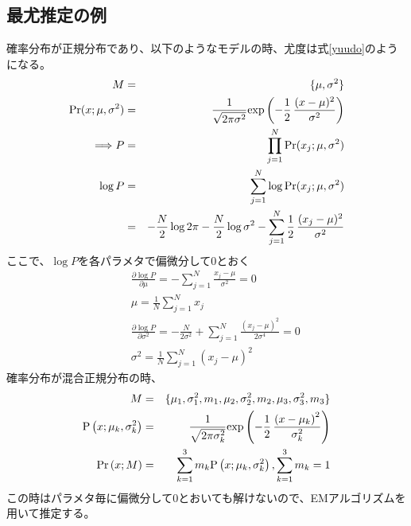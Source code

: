 \documentclass[dvipdfmx,titlepage, a4paper]{jsarticle}%
\begin{document}
\subsection{最尤推定の例}
確率分布が正規分布であり、以下のようなモデルの時、尤度は式\eqref{yuudo}のようになる。
\begin{eqnarray}
	M &=& \{\mu, \sigma^{2}\} \nonumber \\
	{\rm Pr}(x;\mu, \sigma^{2}) &=& \frac{1}{\sqrt{2 \pi \sigma^{2}}}{\rm exp}\left(-\frac{1}{2}\, \frac{(x - \mu)^{2}}{\sigma^{2}}\right) \nonumber\\
	\Longrightarrow
	P &=& \prod_{j = 1}^{N}{\rm Pr}(x_{j};\mu, \sigma^{2}) \nonumber\\
	\log P &=& \sum_{j = 1}^{N}\log {\rm Pr}(x_{j};\mu, \sigma^{2}) \nonumber\\
		  &=& -\frac{N}{2}\log 2\pi - \frac{N}{2}\log \sigma^{2} - \sum_{j = 1}^{N}\frac{1}{2}\, \frac{(x_{j} - \mu)^{2}}{\sigma^{2}}\label{yuudo}
\end{eqnarray}
ここで、$\log P$を各パラメタで偏微分して0とおく
\begin{eqnarray*}
	&&\frac{\partial \log P}{\partial \mu} = - \sum_{j = 1}^{N}\frac{x_{j} - \mu}{\sigma^{2}} = 0\\
	&&\mu = \frac{1}{N}\sum_{j = 1}^{N}x_{j}\\
	&&\frac{\partial \log P}{\partial \sigma^{2}} = -\frac{N}{2\sigma^{2}} + \sum_{j = 1}^{N}\frac{(x_{j} - \mu)^{2}}{2\sigma^{4}} = 0\\
	&&\sigma^{2} = \frac{1}{N}\sum_{j = 1}^{N}(x_{j} - \mu)^{2}
\end{eqnarray*}
確率分布が混合正規分布の時、
\begin{eqnarray*}
	M &=& \{\mu_{1}, \sigma_{1}^{2}, m_{1}, \mu_{2}, \sigma_{2}^{2}, m_{2}, \mu_{3}, \sigma_{3}^{2}, m_{3}\}\\
	{\rm P}\left(x;\mu_{k}, \sigma_{k}^{2}\right) &=& \frac{1}{\sqrt{2 \pi \sigma_{k}^{2}}}{\rm exp}\left(-\frac{1}{2}\, \frac{\left(x - \mu_{k}\right)^{2}}{\sigma_{k}^{2}}\right)\\
	{\rm Pr}\left(x; M\right) &=& \sum_{k = 1}^{3}m_{k}{\rm P}\left(x;\mu_{k}, \sigma_{k}^{2}\right), \sum_{k = 1}^{3} m_{k} = 1
\end{eqnarray*}
この時はパラメタ毎に偏微分して0とおいても解けないので、EMアルゴリズムを用いて推定する。
\end{document}
